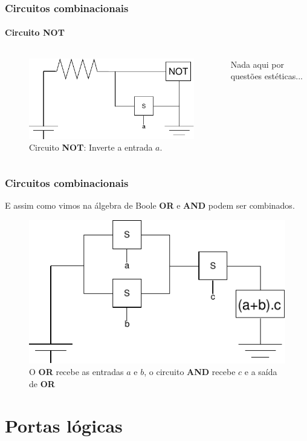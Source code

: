 \begin{frame}
	\frametitle{Circuitos combinacionais}
	\framesubtitle{Circuito NOT}
	\begin{columns}
		\begin{figure}
			\centering
			\includegraphics[width=0.7\linewidth]{images/circuitoNot}
			\caption{Circuito \textbf{NOT}: Inverte a entrada $a$.}
			\label{fig:portanao}
		\end{figure}
		
		\par Nada aqui por questões estéticas...
	\end{columns}
\end{frame}

\begin{frame}
	\frametitle{Circuitos combinacionais}
	\par E assim como vimos na álgebra de Boole \textbf{OR} e \textbf{AND} podem ser combinados.
	\begin{figure}
		\centering
		\includegraphics[width=0.7\linewidth]{images/aMaisBVezesC}
		\caption{O \textbf{OR} recebe as entradas $a$ e $b$, o circuito \textbf{AND} recebe $c$ e a saída de \textbf{OR}}
		\label{fig:amaisbvezesc}
	\end{figure}
\end{frame}

\section{Portas lógicas}

